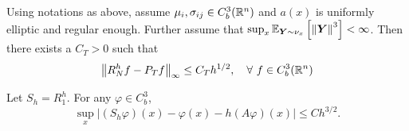 \begin{thm}\label{thm:weakconv}
    Using notations as above, assume $\mu_i,\sigma_{ij} \in C^3_b(\mathbb{R}^n)$ and $a(x)$ is uniformly elliptic and regular enough. Further assume that $\sup_x\mathbb{E}_{\bm{Y} \sim \nu_x}\left[\left\lVert\bm{Y}\right\lVert^3\right]  < \infty$. Then there exists a $C_T > 0$ such that
    \begin{equation*}
        \left\lVert R^h_Nf - P_Tf\right\lVert_\infty \leq C_Th^{1/2},\quad \forall~f \in C^3_b(\mathbb{R}^n)
    \end{equation*}
\end{thm}
\begin{lem}\label{lem:onesteptrans}
    Let $S_h = R^h_1$. For any $\varphi \in C^3_b$, 
    \begin{equation*}
        \sup_x\left|\left(S_h \varphi\right)(x)-\varphi(x)-h(A \varphi)(x)\right| \leq C h^{3 / 2}.
    \end{equation*}
\end{lem}
